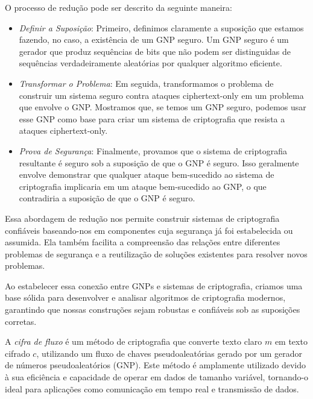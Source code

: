O processo de redução pode ser descrito da seguinte maneira:

\begin{itemize}
\item[] {\em Definir a Suposição}:
  Primeiro, definimos claramente a suposição que estamos fazendo, no caso, a existência de um GNP seguro.
  Um GNP seguro é um gerador que produz sequências de bits que não podem ser distinguidas de sequências verdadeiramente aleatórias por qualquer algoritmo eficiente.

\item[] {\em Transformar o Problema}:
  Em seguida, transformamos o problema de construir um sistema seguro contra ataques ciphertext-only em um problema que envolve o GNP.
  Mostramos que, se temos um GNP seguro, podemos usar esse GNP como base para criar um sistema de criptografia que resista a ataques ciphertext-only.

\item[] {\em Prova de Segurança}:
  Finalmente, provamos que o sistema de criptografia resultante é seguro sob a suposição de que o GNP é seguro.
  Isso geralmente envolve demonstrar que qualquer ataque bem-sucedido ao sistema de criptografia implicaria em um ataque bem-sucedido ao GNP, o que contradiria a suposição de que o GNP é seguro.
\end{itemize}

Essa abordagem de redução nos permite construir sistemas de criptografia confiáveis baseando-nos em componentes cuja segurança já foi estabelecida ou assumida.
Ela também facilita a compreensão das relações entre diferentes problemas de segurança e a reutilização de soluções existentes para resolver novos problemas.

Ao estabelecer essa conexão entre GNPs e sistemas de criptografia, criamos uma base sólida para desenvolver e analisar algoritmos de criptografia modernos, garantindo que nossas construções sejam robustas e confiáveis sob as suposições corretas.

A {\em cifra de fluxo} é um método de criptografia que converte texto claro $m$ em texto cifrado $c$, utilizando um fluxo de chaves pseudoaleatórias gerado por um gerador de números pseudoaleatórios (GNP).
Este método é amplamente utilizado devido à sua eficiência e capacidade de operar em dados de tamanho variável, tornando-o ideal para aplicações como comunicação em tempo real e transmissão de dados.

